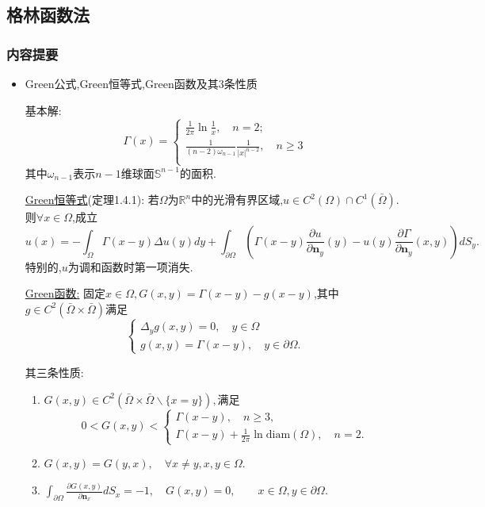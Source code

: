 \documentclass[12pt, a4paper]{ctexart}
\begin{document}
    \subsection{格林函数法}
    	
    \subsubsection{内容提要}
    \begin{itemize}
        \item Green公式,Green恒等式,Green函数及其3条性质
        
        基本解:
        $$\Gamma(x) = \begin{cases}
        \frac1{2\pi}\ln\frac1x,\quad n=2;\\
        \frac1{(n-2)\omega_{n-1}}\frac1{|x|^{n-2}},\quad n\geq 3\\
        \end{cases}$$
        其中$\omega_{n-1}$表示$n-1$维球面$\mathbb{S}^{n-1}$的面积.
        
        \uline{Green恒等式}(定理1.4.1): 若$\Omega$为$\mathbb{R}^n$中的光滑有界区域,$u\in C^2(\Omega)\cap C^1(\bar{\Omega}).$则$\forall x\in \Omega$,成立
        $$u(x) = - \int_\Omega \Gamma(x-y)\Delta u(y)dy + \int_{\partial\Omega}(\Gamma(x-y)\frac{\partial u}{\partial \bm n_y}(y) - u(y)\frac{\partial\Gamma}{\partial\bm n_y}(x, y))dS_y.$$
        特别的,$u$为调和函数时第一项消失.
        
        \uline{Green函数:} 固定$x\in\Omega, G(x, y) = \Gamma(x-y) - g(x-y)$,其中$g\in C^2(\bar\Omega \times \bar\Omega)$满足
        $$\begin{cases}
            \Delta_y g(x,y) = 0, \quad y\in\Omega\\
            g(x, y) = \Gamma(x-y), \quad y\in\partial \Omega.
        \end{cases}$$
        
        其三条性质:
        \begin{enumerate}
            \item $G(x, y)\in C^2(\bar \Omega \times \bar \Omega \backslash\{x=y\}),$满足$$ 0 < G(x,y) < \begin{cases}
                \Gamma(x-y),\quad n\geq 3,\\
                \Gamma(x-y) +\frac1{2\pi}\ln\text{diam}(\Omega),\quad n=2.
            \end{cases}$$
            \item $G(x, y) = G(y, x),\quad \forall x \neq y, x, y\in \Omega.$
            \item $\int_{\partial\Omega}\frac{\partial G(x,y)}{\partial\bm n_x}dS_x = -1, \quad G(x,y) = 0, \qquad x\in\Omega, y\in\partial\Omega.$
        \end{enumerate}
        

\end{itemize}
\end{document}

